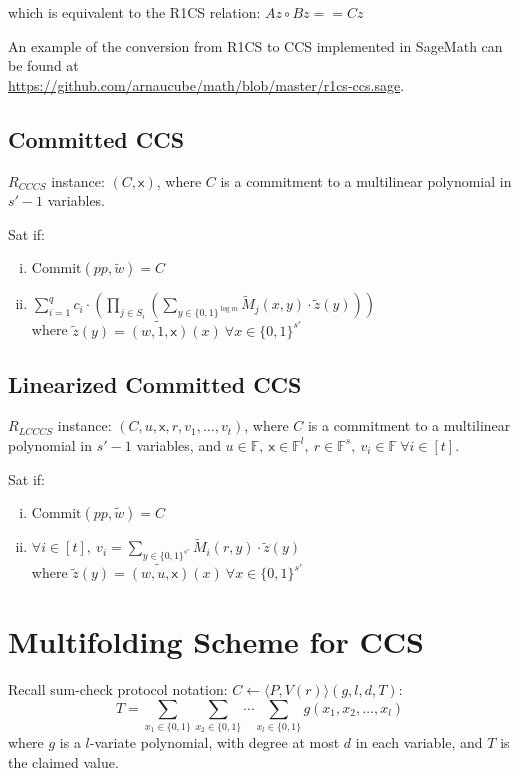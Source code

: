 \documentclass{article}
\theoremstyle{definition}
\begin{document}
which is equivalent to the R1CS relation: $Az \circ Bz == Cz$

An example of the conversion from R1CS to CCS implemented in SageMath can be found at\\
\href{https://github.com/arnaucube/math/blob/master/r1cs-ccs.sage}{https://github.com/arnaucube/math/blob/master/r1cs-ccs.sage}.

\subsection{Committed CCS}
$R_{CCCS}$ instance: $(C, \mathsf{x})$, where $C$ is a commitment to a multilinear polynomial in $s'-1$ variables.

Sat if:
\begin{enumerate}[i.]
	\item $\text{Commit}(pp, \widetilde{w}) = C$
	\item $\sum_{i=1}^q c_i \cdot \left( \prod_{j \in S_i} \left( \sum_{y \in \{0,1\}^{\log m}} \widetilde{M}_j(x, y) \cdot \widetilde{z}(y) \right) \right)$\\
		where $\widetilde{z}(y) = \widetilde{(w, 1, \mathsf{x})}(x) ~\forall x \in \{0, 1\}^{s'}$
\end{enumerate}


\subsection{Linearized Committed CCS}
$R_{LCCCS}$ instance: $(C, u, \mathsf{x}, r, v_1, \ldots, v_t)$, where $C$ is a commitment to a multilinear polynomial in $s'-1$ variables, and $u \in \mathbb{F},~ \mathsf{x} \in \mathbb{F}^l,~ r \in \mathbb{F}^s,~ v_i \in \mathbb{F} ~\forall i \in [t]$.

Sat if:
\begin{enumerate}[i.]
	\item $\text{Commit}(pp, \widetilde{w}) = C$
	\item $\forall i \in [t],~ v_i = \sum_{y \in \{0,1\}^{s'}} \widetilde{M}_i(r, y) \cdot \widetilde{z}(y)$\\
		where $\widetilde{z}(y) = \widetilde{(w, u, \mathsf{x})}(x) ~\forall x \in \{0, 1\}^{s'}$
\end{enumerate}


\section{Multifolding Scheme for CCS}
Recall sum-check protocol notation: \underline{$C \leftarrow \langle P, V(r) \rangle (g, l, d, T)$}:
$$T=\sum_{x_1 \in \{0,1\}} \sum_{x_2 \in \{0,1\}} \cdots \sum_{x_l \in \{0,1\}} g(x_1, x_2, \ldots, x_l)$$
where $g$ is a $l$-variate polynomial, with degree at most $d$ in each variable, and $T$ is the claimed value.
\end{document}
